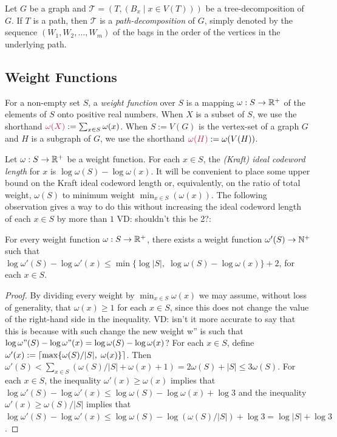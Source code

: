 \documentclass{patmorin}
\makeatletter
\renewcommand{\ge}{\geqslant}
\renewcommand{\le}{\leqslant}
\newcommand{\vida}[1]{{\color{pink} VD: #1}}
\newcommand{\defin}[1]{\emph{\textcolor{brightmaroon}{#1}}}
\def\mathcolor#1#{\@mathcolor{#1}}
\def\@mathcolor#1#2#3{%
  \protect\leavevmode
  \begingroup
    \color#1{#2}#3%
  \endgroup
}
\newcommand{\mathdefin}[1]{\mathcolor{brightmaroon}{#1}}
\newcommand{\calT}{\mathcal{T}}
\DeclarePairedDelimiter{\ceil}{\lceil}{\rceil}
\makeatother
\begin{document}
Let $G$ be a graph and $\calT=(T,(B_x \mid x\in V(T)))$ be a tree-decomposition of $G$.
If $T$ is a path, then $\calT$ is a \defin{path-decomposition} of $G$, simply denoted by the sequence $(W_1, W_2, \dots, W_m)$ of the bags in the order of the vertices in the underlying path.

  \subsection{Weight Functions}

  For a non-empty set $S$, a \defin{weight function} over $S$ is a mapping $\omega:S\to\mathbb{R}^+$ of the elements of $S$ onto positive real numbers.  When $X$ is a subset of $S$, we use the shorthand $\mathdefin{\omega(X)}:=\sum_{x\in S}\omega(x)$.  When $S:=V(G)$ is the vertex-set of a graph $G$ and $H$ is a subgraph of $G$, we use the shorthand $\mathdefin{\omega(H)}:=\omega(V(H))$.

  Let $\omega:S\to\mathbb{R}^+$ be a weight function.  For each $x\in S$, the \defin{(Kraft) ideal codeword length} for $x$ is $\log\omega(S)-\log\omega(x)$.
  It will be convenient to place some upper bound on the Kraft ideal codeword length or, equivalently, on the ratio of total weight, $\omega(S)$ to minimum weight $\min_{x\in S}(\omega(x))$.  The following observation gives a way to do this without increasing the ideal codeword length of each $x\in S$ by more than $1$\vida{shouldn't this be 2?}:

  \begin{obs}\label{obs:nice}
    For every weight function $\omega:S\to\mathbb{R}^+$, there exists a weight function $\omega'(S)\to\mathbb{N}^+$ such that $\log\omega'(S)-\log\omega'(x)\le\min\{\log|S|,\;\log\omega(S)-\log\omega(x)\}+2$, for each $x\in S$.
  \end{obs}

  \begin{proof}
    By dividing every weight by $\min_{x\in S}\omega(x)$ we may assume, without loss of generality, that $\omega(x)\ge 1$ for each $x\in S$, since this does not change the value of the right-hand side in the inequality. \vida{isn't it more accurate to say that this is because with such change the new weight w'' is such that $\log\omega"(S)-\log\omega"(x)=\log\omega(S)-\log\omega(x)$?}
    For each $x\in S$, define $\omega'(x):=\ceil{\max\{\omega(S)/|S|,\; \omega(x)\}}$.  Then $\omega'(S)<\sum_{x\in S}(\omega(S)/|S|+\omega(x)+1)= 2\omega(S)+|S|\le 3\omega(S)$.  For each $x\in S$, the inequality $\omega'(x)\ge \omega(x)$ implies that $\log\omega'(S)-\log\omega'(x)\le\log \omega(S)-\log\omega(x)+\log 3$ and the inequality $\omega'(x)\ge \omega(S)/|S|$ implies that $\log\omega'(S)-\log\omega'(x)\le \log\omega(S)-\log(\omega(S)/|S|) + \log 3 = \log|S| + \log 3$.
  \end{proof}
\end{document}
